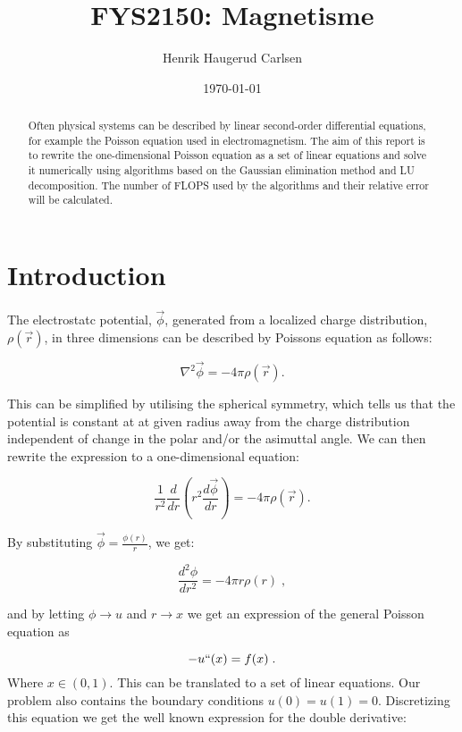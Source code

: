 \documentclass[english,a4paper, 11pt]{article}
\title{FYS2150: Magnetisme}
\author{Henrik Haugerud Carlsen}
\date{\today}
\begin{document}
\maketitle

\begin{abstract}
\centering
Often physical systems can be described by linear second-order differential equations, for example the Poisson equation used in electromagnetism. The aim of this report is to rewrite the one-dimensional Poisson equation as a set of linear equations and solve it numerically using algorithms based on the Gaussian elimination method and LU decomposition. The number of FLOPS used by the algorithms and their relative error will be calculated. 
\end{abstract}


\section{Introduction}
The electrostatc potential, $\vec{\phi}$, generated from a localized charge distribution, $\rho(\vec{r})$, in three dimensions can be described by Poissons equation as follows:

\begin{equation}
\nabla^2 \vec{\phi} = -4\pi \rho(\vec{r}).
\label{eq1}
\end{equation}

This can be simplified by utilising the spherical symmetry, which tells us that the potential is constant at at given radius away from the charge distribution independent of change in the polar and/or the asimuttal angle. We can then rewrite the expression to a one-dimensional equation:

\begin{equation}
\frac{1}{r^2} \frac{d}{dr} (r^2\frac{d \vec{\phi}}{dr}) = -4\pi\rho(\vec{r}).
\label{eq2}
\end{equation}

By substituting $\vec{\phi} = \frac{\phi(r)}{r}$, we get:

\begin{equation}
\frac{d^2 \phi}{dr^2} = -4 \pi r \rho(r) \;,
\label{eq3}
\end{equation}

and by letting $\phi \rightarrow u$ and $r \rightarrow x$ we get an expression of the general Poisson equation as

\begin{equation}
-u``(x) = f(x)\;.
\label{eq4}
\end{equation}
Where $x \in (0,1)$.
This can be translated to a set of linear equations. Our problem also contains the boundary conditions $u(0) = u(1) =0$. Discretizing this equation we get the well known expression for the double derivative:
\end{document}
